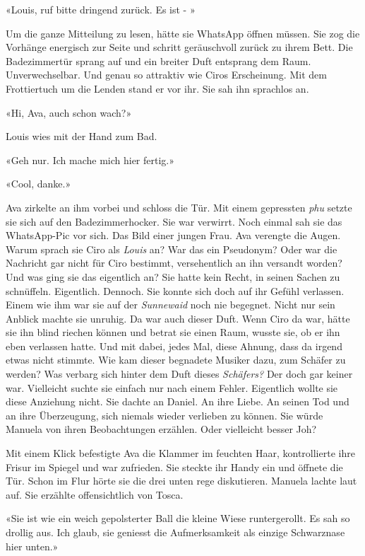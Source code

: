 «Louis, ruf bitte dringend zurück. Es ist - »

Um die ganze Mitteilung zu lesen, hätte sie WhatsApp öffnen müssen. Sie
zog die Vorhänge energisch zur Seite und schritt geräuschvoll zurück zu
ihrem Bett. Die Badezimmertür sprang auf und ein breiter Duft entsprang
dem Raum. Unverwechselbar. Und genau so attraktiv wie Ciros Erscheinung.
Mit dem Frottiertuch um die Lenden stand er vor ihr. Sie sah ihn sprachlos an.

«Hi, Ava, auch schon wach?»

Louis wies mit der Hand zum Bad.

«Geh nur. Ich mache mich hier fertig.»

«Cool, danke.»

Ava zirkelte an ihm vorbei und schloss die Tür. Mit einem gepressten 
\emph{phu} setzte sie sich auf den Badezimmerhocker. Sie war verwirrt.
Noch einmal sah sie das WhatsApp-Pic vor sich. Das Bild einer jungen 
Frau. Ava verengte die Augen. Warum sprach sie Ciro als \emph{Louis} an?
War das ein Pseudonym? Oder war die Nachricht gar nicht für Ciro
bestimmt, versehentlich an ihn versandt worden? Und was ging sie das
eigentlich an? Sie hatte kein Recht, in seinen Sachen zu schnüffeln.
Eigentlich. Dennoch. Sie konnte sich doch auf ihr Gefühl verlassen. Einem wie
ihm war sie auf der \emph{Sunnewaid} noch nie begegnet. Nicht nur sein
Anblick machte sie unruhig. Da war auch dieser Duft. Wenn
Ciro da war, hätte sie ihn blind riechen können und betrat sie einen
Raum, wusste sie, ob er ihn eben verlassen hatte. Und mit dabei, jedes
Mal, diese Ahnung, dass da irgend etwas nicht stimmte. Wie kam dieser
begnadete Musiker dazu, zum Schäfer zu werden? Was verbarg sich hinter
dem Duft dieses \emph{Schäfers?} Der doch gar keiner war. Vielleicht
suchte sie einfach nur nach einem Fehler. 
Eigentlich wollte sie diese Anziehung nicht. Sie dachte an Daniel. An ihre Liebe. An seinen Tod und an 
ihre Überzeugung, sich niemals wieder verlieben zu können.
Sie würde Manuela von ihren Beobachtungen erzählen. Oder vielleicht
besser Joh? 

\sectionbreak

Mit einem Klick befestigte Ava die Klammer im feuchten Haar, kontrollierte ihre Frisur im Spiegel und war zufrieden. 
Sie steckte ihr Handy ein und öffnete die Tür. Schon im Flur hörte sie die drei unten rege diskutieren. Manuela lachte laut auf. Sie erzählte offensichtlich von Tosca.

«Sie ist wie ein weich gepolsterter Ball die kleine Wiese runtergerollt. Es sah so drollig
aus. Ich glaub, sie geniesst die Aufmerksamkeit als einzige Schwarznase
hier unten.»
